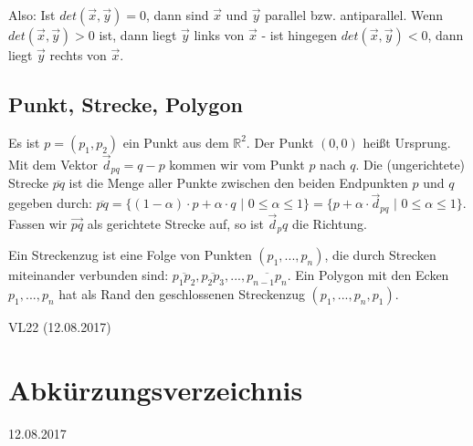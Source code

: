 \documentclass[12pt]{article}
\begin{document}
Also: Ist $det(\vec{x},\vec{y}) = 0$, dann sind $\vec{x}$ und $\vec{y}$ parallel bzw. antiparallel. Wenn $det(\vec{x},\vec{y}) > 0$ ist, dann liegt $\vec{y}$ links von $\vec{x}$ - ist hingegen $det(\vec{x},\vec{y}) < 0$, dann liegt $\vec{y}$ rechts von $\vec{x}$.

\subsection{Punkt, Strecke, Polygon}

Es ist $p = (p_1, p_2)$ ein Punkt aus dem $\mathbb{R}^2$. Der Punkt $(0,0)$ heißt Ursprung. Mit dem Vektor $\vec{d}_{pq} = q - p$ kommen wir vom Punkt $p$ nach $q$. Die (ungerichtete) Strecke $\overline{pq}$ ist die Menge aller Punkte zwischen den beiden Endpunkten $p$ und $q$ gegeben durch: $\overline{pq} = \{(1-\alpha) \cdot p + \alpha \cdot q$ $|$ $0 \leq \alpha \leq 1\} = \{p + \alpha \cdot \vec{d}_{pq}$ $|$ $0 \leq \alpha \leq 1\}$. Fassen wir $\vec{pq}$ als gerichtete Strecke auf, so ist $\vec{d}_pq$ die Richtung.

Ein Streckenzug ist eine Folge von Punkten $(p_1, ..., p_n)$, die durch Strecken miteinander verbunden sind: $\overline{p_1p_2}, \overline{p_2p_3}, ..., \overline{p_{n-1}p_n}$. Ein Polygon mit den Ecken $p_1, ..., p_n$ hat als Rand den geschlossenen Streckenzug $(p_1, ..., p_n, p_1)$.

VL22 (12.08.2017)

\clearpage

\section{Abkürzungsverzeichnis}

12.08.2017
\end{document}
